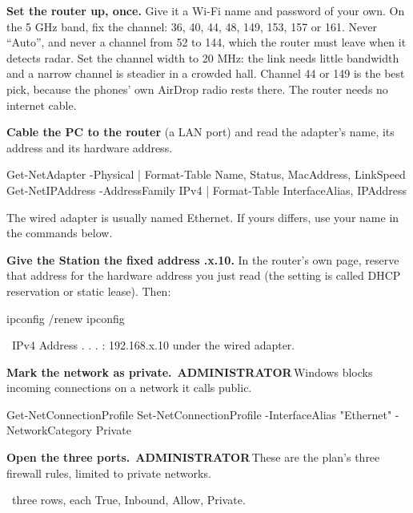 \documentclass[10pt]{article}
\newcommand{\code}[1]{{\ttfamily\fontsize{8.8}{11}\selectfont #1}}
\newcommand{\tagchip}[2]{{\setlength{\fboxsep}{1.6pt}\colorbox{#1}{\fontsize{6.6}{8}\selectfont\bfseries\color{white}\,#2\,}}}
\newcommand{\asadmin}{\tagchip{admin}{ADMINISTRATOR}\enskip}
\newcommand{\see}{\par\vspace{0.6mm}{\footnotesize\color{mute}You should see:}}
\newcommand{\act}[1]{\textbf{#1}\enskip}
\newcommand{\step}{\needspace{21mm}\item}
\begin{document}
\begin{steps}
\step \act{Set the router up, once.} Give it a Wi-Fi name and password of your own. On the 5 GHz band, fix the channel:
      36, 40, 44, 48, 149, 153, 157 or 161. Never ``Auto'', and never a channel from 52 to 144, which the router must
      leave when it detects radar. Set the channel width to 20 MHz: the link needs little bandwidth and a narrow channel
      is steadier in a crowded hall. Channel 44 or 149 is the best pick, because the phones' own AirDrop radio rests there.
      The router needs no internet cable.

\step \act{Cable the PC to the router} (a LAN port) and read the adapter's name, its address and its hardware address.
\begin{cmd}
Get-NetAdapter -Physical | Format-Table Name, Status, MacAddress, LinkSpeed
Get-NetIPAddress -AddressFamily IPv4 | Format-Table InterfaceAlias, IPAddress
\end{cmd}
      The wired adapter is usually named \code{Ethernet}. If yours differs, use your name in the commands below.

\step \act{Give the Station the fixed address \code{192.168.x.10}.} In the router's own page, reserve that address for
      the hardware address you just read (the setting is called DHCP reservation or static lease). Then:
\begin{cmd}
ipconfig /renew
ipconfig
\end{cmd}
      \see\ \code{IPv4 Address . . . : 192.168.x.10} under the wired adapter.

\step \act{Mark the network as private.} \asadmin Windows blocks incoming connections on a network it calls public.
\begin{cmd}
Get-NetConnectionProfile
Set-NetConnectionProfile -InterfaceAlias "Ethernet" -NetworkCategory Private
\end{cmd}

\step \act{Open the three ports.} \asadmin These are the plan's three firewall rules, limited to private networks.
      \see\ three rows, each \code{True}, \code{Inbound}, \code{Allow}, \code{Private}.


\end{steps}
\end{document}
